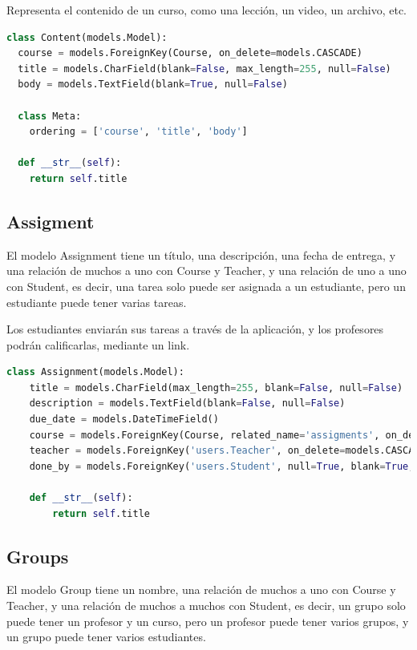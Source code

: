 Representa el contenido de un curso, como una lección, un video, un archivo, etc.

\begin{lstlisting}[language=Python]
class Content(models.Model):
  course = models.ForeignKey(Course, on_delete=models.CASCADE)
  title = models.CharField(blank=False, max_length=255, null=False)
  body = models.TextField(blank=True, null=False)

  class Meta:
    ordering = ['course', 'title', 'body']

  def __str__(self):
    return self.title
\end{lstlisting}

\subsection{Assigment}

El modelo Assignment tiene un título, una descripción, una fecha de entrega, y una relación de muchos a uno con Course y Teacher, y una relación de uno a uno con Student, es decir, una tarea solo puede ser asignada a un estudiante, pero un estudiante puede tener varias tareas.

Los estudiantes enviarán sus tareas a través de la aplicación, y los profesores podrán calificarlas, mediante un link.

\begin{lstlisting}[language=Python]
class Assignment(models.Model):
    title = models.CharField(max_length=255, blank=False, null=False)
    description = models.TextField(blank=False, null=False)
    due_date = models.DateTimeField()
    course = models.ForeignKey(Course, related_name='assigments', on_delete=models.CASCADE)
    teacher = models.ForeignKey('users.Teacher', on_delete=models.CASCADE)
    done_by = models.ForeignKey('users.Student', null=True, blank=True, on_delete=models.SET_NULL)

    def __str__(self):
        return self.title
  \end{lstlisting}

  \subsection{Groups}

El modelo Group tiene un nombre, una relación de muchos a uno con Course y Teacher, y una relación de muchos a muchos con Student, es decir, un grupo solo puede tener un profesor y un curso, pero un profesor puede tener varios grupos, y un grupo puede tener varios estudiantes.

